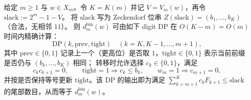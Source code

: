 \begin{proposition}\label{prop:fold-bin-digit-dp}
给定 \(m\ge 1\) 与 \(w\in X_m\)。令 \(K=K(m)\) 并记 \(V=V_m(w)\)，再令 \(\mathrm{slack}:=2^m-1-V\)。
将 \(\mathrm{slack}\) 写为 Zeckendorf 位串 \(Z(\mathrm{slack})=(b_1,\dots,b_K)\)（合法，无相邻 \(11\)）。
则 \(d^{\mathrm{bin}}_m(w)\) 可由如下 digit DP 在 \(O(K-m)=O(m)\) 时间内精确计算：
\[
\mathrm{DP}(k,\mathrm{prev},\mathrm{tight})
\quad(k=K,K-1,\dots,m+1),
\]
其中 \(\mathrm{prev}\in\{0,1\}\) 记录上一个（更高位）是否取 \(1\)，\(\mathrm{tight}\in\{0,1\}\) 表示当前前缀是否仍与 \((b_k,\dots,b_K)\) 相同；
转移时允许选择 \(c_k\in\{0,1\}\)，满足
\[
c_k c_{k+1}=0,\qquad
\mathrm{tight}=1\Rightarrow c_k\le b_k,\qquad
w_m=1\Rightarrow c_{m+1}=0,
\]
并按是否保持等号更新 \(\mathrm{tight}\)。该 DP 的输出即为满足 \(\sum_{k=m+1}^K c_k F_{k+1}\le \mathrm{slack}\) 的尾部数目，从而等于 \(d^{\mathrm{bin}}_m(w)\)。
\end{proposition}



